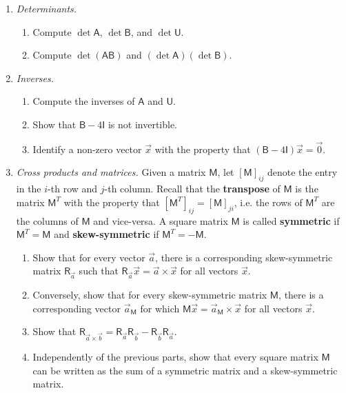 \begin{enumerate}
\begin{enumerate}
\end{enumerate}
\newpage
\item \emph{Determinants.}
\begin{enumerate}
\item Compute $\det\mathsf{A}$, $\det\mathsf{B}$, and $\det\mathsf{U}$.
\item Compute $\det(\mathsf{AB})$ and $(\det\mathsf{A})(\det\mathsf{B})$.
\end{enumerate}
\item \emph{Inverses.}
\begin{enumerate}
\item Compute the inverses of $\mathsf{A}$ and $\mathsf{U}$.
\item Show that $\mathsf{B} - 4\mathsf{I}$ is not invertible.
\item Identify a non-zero vector $\vec{x}$ with the property that $(\mathsf{B} - 4\mathsf{I})\vec{x} = \vec{0}$.
\end{enumerate}
\item \emph{Cross products and matrices.} Given a matrix $\mathsf{M}$, let $[\mathsf{M}]_{ij}$ denote the entry in the $i$-th row and $j$-th column. Recall that the \textbf{transpose} of $\mathsf{M}$ is the matrix $\mathsf{M}^T$ with the property that $[\mathsf{M}^T]_{ij} = [\mathsf{M}]_{ji}$, i.e. the rows of $\mathsf{M}^T$ are the columns of $\mathsf{M}$ and vice-versa. A square matrix $\mathsf{M}$ is called \textbf{symmetric} if $\mathsf{M}^T = \mathsf{M}$ and \textbf{skew-symmetric} if $\mathsf{M}^T = -\mathsf{M}$.
\begin{enumerate}
\item Show that for every vector $\vec{a}$, there is a corresponding skew-symmetric matrix $\mathsf{R}_{\vec{a}}$ such that $\mathsf{R}_{\vec{a}}\vec{x} = \vec{a}\times\vec{x}$ for all vectors $\vec{x}$.
\item Conversely, show that for every skew-symmetric matrix $\mathsf{M}$, there is a corresponding vector $\vec{a}_{\mathsf{M}}$ for which $\mathsf{M}\vec{x} = \vec{a}_{\mathsf{M}}\times\vec{x}$ for all vectors $\vec{x}$.
\item Show that $\mathsf{R}_{\vec{a}\times\vec{b}} = \mathsf{R}_{\vec{a}}\mathsf{R}_{\vec{b}} - \mathsf{R}_{\vec{b}}\mathsf{R}_{\vec{a}}$.
\item Independently of the previous parts, show that every square matrix $\mathsf{M}$ can be written as the sum of a symmetric matrix and a skew-symmetric matrix.
\end{enumerate}
\end{enumerate}


